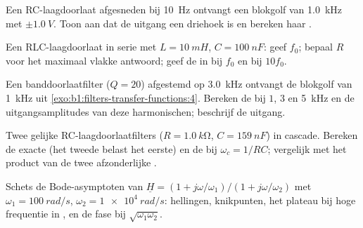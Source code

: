 \begin{exercise}[$\star\star$]\label{exo:b1:filters-transfer-functions:6}
Een RC-laagdoorlaat afgesneden bij \qty{10}{Hz} ontvangt een blokgolf van
\qty{1.0}{kHz} met  $\pm\qty{1.0}{V}$. Toon aan dat de uitgang een driehoek is
en bereken haar .
\end{exercise}

\begin{exercise}[$\star\star$]\label{exo:b1:filters-transfer-functions:7}
Een RLC-laagdoorlaat in serie met $L = \qty{10}{mH}$, $C = \qty{100}{nF}$: geef
$f_0$; bepaal $R$ voor het maximaal vlakke antwoord; geef de  in
 bij $f_0$ en bij $10f_0$.
\end{exercise}

\begin{exercise}[$\star\star$]\label{exo:b1:filters-transfer-functions:8}
Een banddoorlaatfilter ($Q = 20$) afgestemd op \qty{3.0}{kHz} ontvangt de blokgolf van
\qty{1}{kHz} uit \cref{exo:b1:filters-transfer-functions:4}. Bereken de
 bij $1$, $3$ en \qty{5}{kHz} en de uitgangsamplitudes van deze
harmonischen; beschrijf de uitgang.
\end{exercise}

\begin{exercise}[$\star\star$]\label{exo:b1:filters-transfer-functions:9}
Twee gelijke RC-laagdoorlaatfilters ($R = \qty{1.0}{k\ohm}$, $C = \qty{159}{nF}$)
in cascade. Bereken de exacte  (het tweede belast het
eerste) en de  bij $\omega_c = 1/RC$; vergelijk met het product van
de twee afzonderlijke .
\end{exercise}

\begin{exercise}[$\star\star\star$]\label{exo:b1:filters-transfer-functions:10}
Schets de Bode-asymptoten van $\underline H = (1 + j\omega/\omega_1)/
(1 + j\omega/\omega_2)$ met $\omega_1 = \qty{100}{rad/s}$, $\omega_2 =
\qty{1e4}{rad/s}$: hellingen, knikpunten, het plateau bij hoge frequentie in
, en de fase bij $\sqrt{\omega_1\omega_2}$.
\end{exercise}

